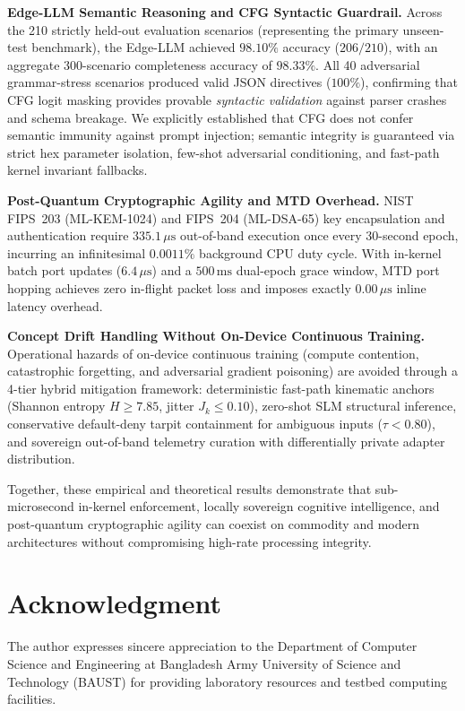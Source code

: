 \documentclass{ieeeaccess}
\renewcommand{\_}{\textunderscore\allowbreak}
\begin{document}
\textbf{Edge-LLM Semantic Reasoning and CFG Syntactic Guardrail.}
Across the 210 strictly held-out evaluation scenarios (representing the primary unseen-test benchmark), the Edge-LLM achieved $98.10\%$ accuracy ($206/210$), with an aggregate 300-scenario completeness accuracy of $98.33\%$. All 40 adversarial grammar-stress scenarios produced valid JSON
directives ($100\%$), confirming that CFG logit masking provides provable \textit{syntactic validation}
against parser crashes and schema breakage. We explicitly established that CFG does not confer semantic
immunity against prompt injection; semantic integrity is guaranteed via strict hex parameter isolation,
few-shot adversarial conditioning, and fast-path kernel invariant fallbacks.

\textbf{Post-Quantum Cryptographic Agility and MTD Overhead.}
NIST FIPS~203 (ML-KEM-1024) and FIPS~204 (ML-DSA-65) key encapsulation and authentication require
$335.1\,\mu\text{s}$ out-of-band execution once every 30-second epoch, incurring an infinitesimal
$0.0011\%$ background CPU duty cycle. With in-kernel batch port updates ($6.4\,\mu\text{s}$) and a
$500\,\text{ms}$ dual-epoch grace window, MTD port hopping achieves zero in-flight packet loss and
imposes exactly $0.00\,\mu\text{s}$ inline latency overhead.

\textbf{Concept Drift Handling Without On-Device Continuous Training.}
Operational hazards of on-device continuous training (compute contention, catastrophic forgetting, and
adversarial gradient poisoning) are avoided through a 4-tier hybrid mitigation framework: deterministic
fast-path kinematic anchors (Shannon entropy $H \ge 7.85$, jitter $J_k \le 0.10$), zero-shot SLM
structural inference, conservative default-deny tarpit containment for ambiguous inputs ($\tau < 0.80$),
and sovereign out-of-band telemetry curation with differentially private adapter distribution.

Together, these empirical and theoretical results demonstrate that sub-microsecond in-kernel enforcement,
locally sovereign cognitive intelligence, and post-quantum cryptographic agility can coexist on commodity
and modern architectures without compromising high-rate processing integrity.

\section*{Acknowledgment}
The author expresses sincere appreciation to the Department of Computer Science
and Engineering at Bangladesh Army University of Science and Technology (BAUST)
for providing laboratory resources and testbed computing facilities.
\end{document}
